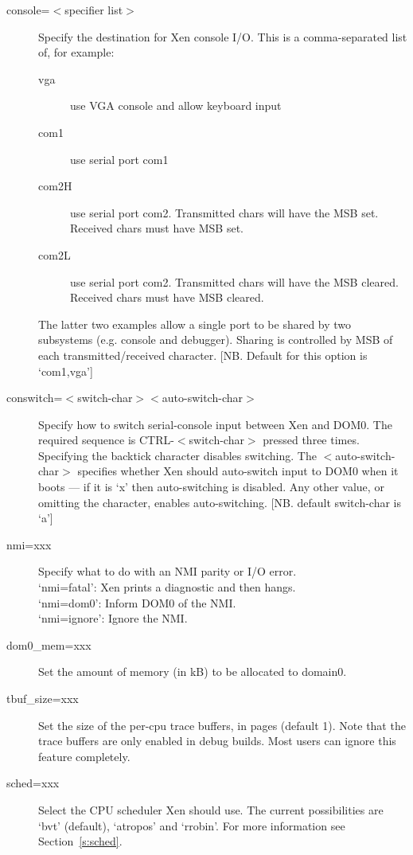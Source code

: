 \documentclass[11pt,twoside,final,openright]{report}
\begin{document}
{\begin{description}
\item [console=$<$specifier list$>$ ] 
 Specify the destination for Xen console I/O.
 This is a comma-separated list of, for example:
\begin{description}
 \item[vga]  use VGA console and allow keyboard input
 \item[com1] use serial port com1
 \item[com2H] use serial port com2. Transmitted chars will
   have the MSB set. Received chars must have
   MSB set.
 \item[com2L] use serial port com2. Transmitted chars will
   have the MSB cleared. Received chars must
   have MSB cleared.
\end{description}
 The latter two examples allow a single port to be
 shared by two subsystems (e.g. console and
 debugger). Sharing is controlled by MSB of each
 transmitted/received character.
 [NB. Default for this option is `com1,vga'] 

\item [conswitch=$<$switch-char$><$auto-switch-char$>$ ] 
 Specify how to switch serial-console input between
 Xen and DOM0. The required sequence is CTRL-$<$switch-char$>$
 pressed three times. Specifying the backtick character 
 disables switching.
 The $<$auto-switch-char$>$ specifies whether Xen should
 auto-switch input to DOM0 when it boots --- if it is `x'
 then auto-switching is disabled.  Any other value, or
 omitting the character, enables auto-switching.
 [NB. default switch-char is `a'] 

\item [nmi=xxx ] 
 Specify what to do with an NMI parity or I/O error. \\
 `nmi=fatal':  Xen prints a diagnostic and then hangs. \\
 `nmi=dom0':   Inform DOM0 of the NMI. \\
 `nmi=ignore': Ignore the NMI. 

\item [dom0\_mem=xxx ] 
 Set the amount of memory (in kB) to be allocated to domain0.  

\item [tbuf\_size=xxx ] 
 Set the size of the per-cpu trace buffers, in pages
 (default 1).  Note that the trace buffers are only
 enabled in debug builds.  Most users can ignore
 this feature completely. 

\item [sched=xxx ] 
 Select the CPU scheduler Xen should use.  The current
 possibilities are `bvt' (default), `atropos' and `rrobin'. 
 For more information see Section~\ref{s:sched}. 


\end{description}}
\end{document}
